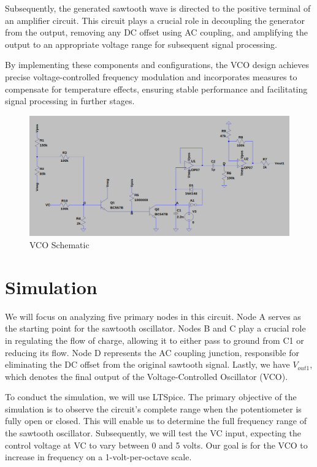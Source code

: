 \documentclass{article}
\begin{document}
Subsequently, the generated sawtooth wave is directed to the positive terminal of an amplifier circuit. This circuit plays a crucial role in decoupling the generator from the output, removing any DC offset using AC coupling, and amplifying the output to an appropriate voltage range for subsequent signal processing.

By implementing these components and configurations, the VCO design achieves precise voltage-controlled frequency modulation and incorporates measures to compensate for temperature effects, ensuring stable performance and facilitating signal processing in further stages.


\begin{figure}[H]
  \includegraphics[width=1\linewidth]{png/vco_schem.png}
  \caption{VCO Schematic}
\end{figure}


\section*{\textcolor{mycolor}{Simulation}}
We will focus on analyzing five primary nodes in this circuit. Node A serves as the starting point for the sawtooth oscillator. Nodes B and C play a crucial role in regulating the flow of charge, allowing it to either pass to ground from C1 or reducing its flow. Node D represents the AC coupling junction, responsible for eliminating the DC offset from the original sawtooth signal. Lastly, we have $V_{out1}$, which denotes the final output of the Voltage-Controlled Oscillator (VCO).

To conduct the simulation, we will use LTSpice. The primary objective of the simulation is to observe the circuit's complete range when the potentiometer is fully open or closed. This will enable us to determine the full frequency range of the sawtooth oscillator. Subsequently, we will test the VC input, expecting the control voltage at VC to vary between 0 and 5 volts. Our goal is for the VCO to increase in frequency on a 1-volt-per-octave scale.
\end{document}
